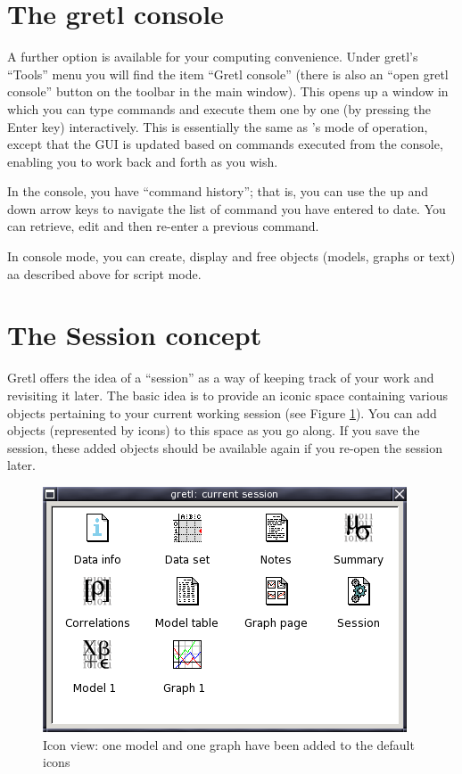 \section{The gretl console}
\label{console}

A further option is available for your computing convenience. Under
gretl's ``Tools'' menu you will find the item ``Gretl console''
(there is also an ``open gretl console'' button on the toolbar in the
main window).  This opens up a window in which you can type commands
and execute them one by one (by pressing the Enter key) interactively.
This is essentially the same as 's mode of operation,
except that the GUI is updated based on commands executed from the
console, enabling you to work back and forth as you wish.

In the console, you have ``command history''; that is, you can use the
up and down arrow keys to navigate the list of command you have
entered to date.  You can retrieve, edit and then re-enter a previous
command.

In console mode, you can create, display and free objects (models,
graphs or text) aa described above for script mode.

\section{The Session concept}
\label{session}

Gretl offers the idea of a ``session'' as a way of keeping track
of your work and revisiting it later. The basic idea is to provide an
iconic space containing various objects pertaining to your current
working session (see Figure \ref{fig-session}).  You can add objects
(represented by icons) to this space as you go along.  If you save the
session, these added objects should be available again if you re-open
the session later.

\begin{figure}[htbp]
  \begin{center}
    \includegraphics[scale=0.5]{figures/session}
  \end{center}
  \caption{Icon view: one model and one graph have been added to the
    default icons}
  \label{fig-session}
\end{figure}


